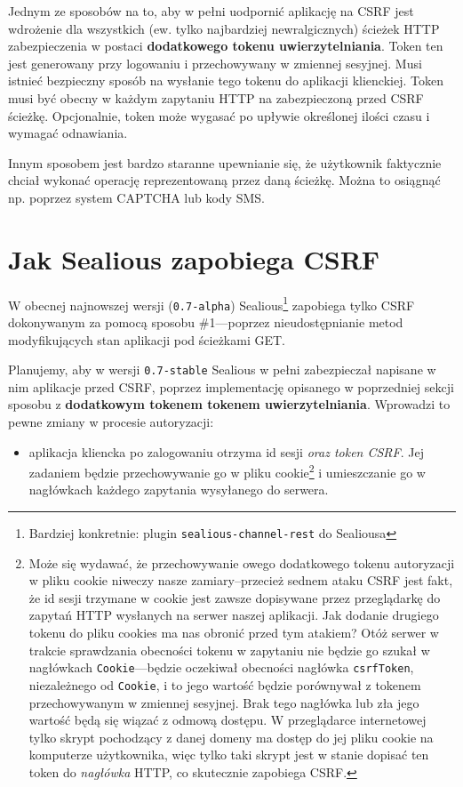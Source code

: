 \documentclass[12pt,polish,a4paper,]{report}
\providecommand{\tightlist}{%
  \setlength{\itemsep}{0pt}\setlength{\parskip}{0pt}}
\begin{document}
Jednym ze sposobów na to, aby w pełni uodpornić aplikację na CSRF jest
wdrożenie dla wszystkich (ew. tylko najbardziej newralgicznych) ścieżek
HTTP zabezpieczenia w postaci \textbf{dodatkowego tokenu
uwierzytelniania}. Token ten jest generowany przy logowaniu i
przechowywany w zmiennej sesyjnej. Musi istnieć bezpieczny sposób na
wysłanie tego tokenu do aplikacji klienckiej. Token musi być obecny w
każdym zapytaniu HTTP na zabezpieczoną przed CSRF ścieżkę. Opcjonalnie,
token może wygasać po upływie określonej ilości czasu i wymagać
odnawiania.

Innym sposobem jest bardzo staranne upewnianie się, że użytkownik
faktycznie chciał wykonać operację reprezentowaną przez daną ścieżkę.
Można to osiągnąć np. poprzez system CAPTCHA lub kody SMS.

\section{Jak Sealious zapobiega CSRF}\label{jak-sealious-zapobiega-csrf}

W obecnej najnowszej wersji (\texttt{0.7-alpha}) Sealious\footnote{Bardziej
  konkretnie: plugin \texttt{sealious-channel-rest} do Sealiousa}
zapobiega tylko CSRF dokonywanym za pomocą sposobu \#1---poprzez
nieudostępnianie metod modyfikujących stan aplikacji pod ścieżkami GET.

Planujemy, aby w wersji \texttt{0.7-stable} Sealious w pełni
zabezpieczał napisane w nim aplikacje przed CSRF, poprzez implementację
opisanego w poprzedniej sekcji sposobu z \textbf{dodatkowym tokenem
tokenem uwierzytelniania}. Wprowadzi to pewne zmiany w procesie
autoryzacji:

\begin{itemize}
\tightlist
\item
  aplikacja kliencka po zalogowaniu otrzyma id sesji \emph{oraz token
  CSRF}. Jej zadaniem będzie przechowywanie go w pliku cookie\footnote{Może
    się wydawać, że przechowywanie owego dodatkowego tokenu autoryzacji
    w pliku cookie niweczy nasze zamiary--przecież sednem ataku CSRF
    jest fakt, że id sesji trzymane w cookie jest zawsze dopisywane
    przez przeglądarkę do zapytań HTTP wysłanych na serwer naszej
    aplikacji. Jak dodanie drugiego tokenu do pliku cookies ma nas
    obronić przed tym atakiem? Otóż serwer w trakcie sprawdzania
    obecności tokenu w zapytaniu nie będzie go szukał w nagłówkach
    \texttt{Cookie}---będzie oczekiwał obecności nagłówka
    \texttt{csrfToken}, niezależnego od \texttt{Cookie}, i to jego
    wartość będzie porównywał z tokenem przechowywanym w zmiennej
    sesyjnej. Brak tego nagłówka lub zła jego wartość będą się wiązać z
    odmową dostępu. W przeglądarce internetowej tylko skrypt pochodzący
    z danej domeny ma dostęp do jej pliku cookie na komputerze
    użytkownika, więc tylko taki skrypt jest w stanie dopisać ten token
    do \emph{nagłówka} HTTP, co skutecznie zapobiega CSRF.} i
  umieszczanie go w nagłówkach każdego zapytania wysyłanego do serwera.
\end{itemize}
\end{document}
